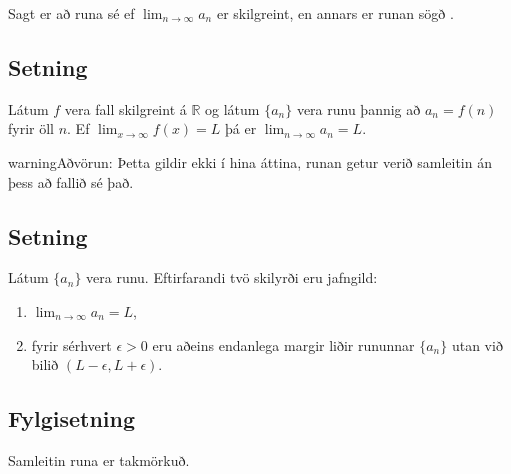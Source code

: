 \documentclass[b5paper,10pt,icelandic]{sphinxmanual}
\begin{document}
Sagt er að runa sé  ef \(\lim_{n\rightarrow \infty}a_n\)
er skilgreint, en annars er runan sögð .


\subsection{Setning}
\label{\detokenize{kafli09:setning}}
Látum \(f\) vera fall skilgreint á \({{\mathbb  R}}\) og látum
\(\{a_n\}\) vera runu þannig að \(a_n=f(n)\) fyrir öll
\(n\). Ef \(\lim_{x\rightarrow
\infty}f(x)=L\) þá er \(\lim_{n\rightarrow\infty}a_n=L\).

\begin{sphinxadmonition}{warning}{Aðvörun:}
Þetta gildir ekki í hina áttina, runan getur verið
samleitin án þess að fallið sé það.
\end{sphinxadmonition}


\subsection{Setning}
\label{\detokenize{kafli09:id3}}
Látum \(\{a_n\}\) vera runu. Eftirfarandi tvö skilyrði eru jafngild:
\begin{enumerate}
\item {} 
\(\lim_{n\rightarrow\infty}a_n=L\),

\item {} 
fyrir sérhvert \(\epsilon>0\) eru aðeins endanlega margir liðir
rununnar \(\{a_n\}\) utan við bilið
\((L-\epsilon, L+\epsilon)\).

\end{enumerate}


\subsection{Fylgisetning}
\label{\detokenize{kafli09:fylgisetning}}
Samleitin runa er takmörkuð.
\end{document}
